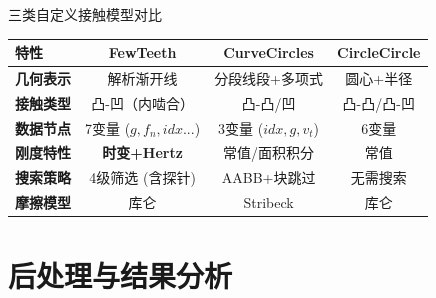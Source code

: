 \documentclass[aspectratio=169,10pt,xcolor=table]{ctexbeamer}
\begin{document}
\begin{frame}{三类自定义接触模型对比}
  \begin{table}
  \centering
  \small
  \begin{tabular}{lccc}
  \toprule
  特性 & FewTeeth & CurveCircles & CircleCircle \\
  \midrule
  \textbf{几何表示} & 解析渐开线 & 分段线段+多项式 & 圆心+半径 \\
  \textbf{接触类型} & 凸-凹（内啮合） & 凸-凸/凹 & 凸-凸/凸-凹 \\
  \textbf{数据节点} & 7变量 ($g, f_n, idx...$) & 3变量 ($idx, g, v_t$) & 6变量 \\
  \textbf{刚度特性} & \textbf{时变+Hertz} & 常值/面积积分 & 常值 \\
  \textbf{搜索策略} & 4级筛选 (含探针) & AABB+块跳过 & 无需搜索 \\
  \textbf{摩擦模型} & 库仑 & Stribeck & 库仑 \\
  \bottomrule
  \end{tabular}
  \end{table}
\end{frame}

\section{后处理与结果分析}
\end{document}
